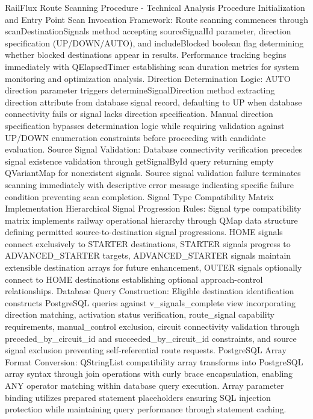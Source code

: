 
RailFlux Route Scanning Procedure - Technical Analysis
Procedure Initialization and Entry Point
Scan Invocation Framework: Route scanning commences through scanDestinationSignals method accepting sourceSignalId parameter, direction specification (UP/DOWN/AUTO), and includeBlocked boolean flag determining whether blocked destinations appear in results. Performance tracking begins immediately with QElapsedTimer establishing scan duration metrics for system monitoring and optimization analysis.
Direction Determination Logic: AUTO direction parameter triggers determineSignalDirection method extracting direction attribute from database signal record, defaulting to UP when database connectivity fails or signal lacks direction specification. Manual direction specification bypasses determination logic while requiring validation against UP/DOWN enumeration constraints before proceeding with candidate evaluation.
Source Signal Validation: Database connectivity verification precedes signal existence validation through getSignalById query returning empty QVariantMap for nonexistent signals. Source signal validation failure terminates scanning immediately with descriptive error message indicating specific failure condition preventing scan completion.
Signal Type Compatibility Matrix Implementation
Hierarchical Signal Progression Rules: Signal type compatibility matrix implements railway operational hierarchy through QMap data structure defining permitted source-to-destination signal progressions. HOME signals connect exclusively to STARTER destinations, STARTER signals progress to ADVANCED_STARTER targets, ADVANCED_STARTER signals maintain extensible destination arrays for future enhancement, OUTER signals optionally connect to HOME destinations establishing optional approach-control relationships.
Database Query Construction: Eligible destination identification constructs PostgreSQL queries against v_signals_complete view incorporating direction matching, activation status verification, route_signal capability requirements, manual_control exclusion, circuit connectivity validation through preceded_by_circuit_id and succeeded_by_circuit_id constraints, and source signal exclusion preventing self-referential route requests.
PostgreSQL Array Format Conversion: QStringList compatibility array transforms into PostgreSQL array syntax through join operations with curly brace encapsulation, enabling ANY operator matching within database query execution. Array parameter binding utilizes prepared statement placeholders ensuring SQL injection protection while maintaining query performance through statement caching.
